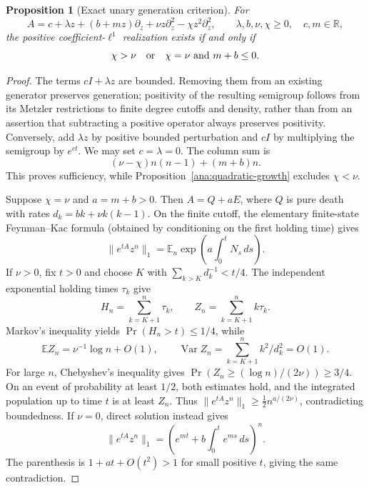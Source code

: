 \documentclass[reqno]{amsart}
\newtheorem{proposition}[theorem]{Proposition}
\theoremstyle{definition}
\theoremstyle{remark}
\newcommand{\R}{\mathbb R}
\begin{document}
\begin{proposition}[Exact unary generation criterion]\label{ana:unary-l1}
For
\[
 A=c+\lambda z+(b+mz)\partial_z+
             \nu z\partial_z^2-\chi z^2\partial_z^2,
 \qquad \lambda,b,\nu,\chi\ge0,\quad c,m\in\R,
\]
the positive coefficient-\(\ell^1\) realization exists if and only if
\[
 \chi>\nu
 \quad\hbox{or}\quad
 \chi=\nu\ \hbox{and}\ m+b\le0 .
\]
\end{proposition}
\begin{proof}
The terms \(cI+\lambda z\) are bounded.  Removing them from an existing
generator preserves generation; positivity of the resulting semigroup
follows from its Metzler restrictions to finite degree cutoffs and
density, rather than from an assertion that subtracting a positive
operator always preserves positivity.  Conversely, add \(\lambda z\)
by positive bounded perturbation and \(cI\) by multiplying the semigroup
by \(e^{ct}\).  We may set \(c=\lambda=0\).
The column sum is
\[
 (\nu-\chi)n(n-1)+(m+b)n.
\]
This proves sufficiency, while Proposition~\ref{ana:quadratic-growth}
excludes \(\chi<\nu\).

Suppose \(\chi=\nu\) and \(a=m+b>0\).  Then \(A=Q+aE\), where \(Q\)
is pure death with rates \(d_k=bk+\nu k(k-1)\).
On the finite cutoff, the elementary finite-state Feynman--Kac formula
(obtained by conditioning on the first holding time) gives
\[
 \|e^{tA}z^n\|_1
 =\mathbb E_n\exp\left(a\int_0^t N_s\,ds\right).
\]
If \(\nu>0\), fix \(t>0\) and choose \(K\) with
\(\sum_{k>K}d_k^{-1}<t/4\).
The independent exponential holding times \(\tau_k\) give
\[
 H_n=\sum_{k=K+1}^n\tau_k,\qquad
 Z_n=\sum_{k=K+1}^n k\tau_k.
\]
Markov's inequality yields \(\Pr(H_n>t)\le1/4\), while
\[
 \mathbb EZ_n=\nu^{-1}\log n+O(1),\qquad
 \operatorname{Var}Z_n=\sum_{k=K+1}^n k^2/d_k^2=O(1).
\]
For large \(n\), Chebyshev's inequality gives
\(\Pr(Z_n\ge(\log n)/(2\nu))\ge3/4\).
On an event of probability at least \(1/2\), both estimates hold, and
the integrated population up to time \(t\) is at least \(Z_n\).
Thus \(\|e^{tA}z^n\|_1\ge\tfrac12 n^{a/(2\nu)}\), contradicting boundedness.
If \(\nu=0\), direct solution instead gives
\[
 \|e^{tA}z^n\|_1
 =\left(e^{mt}+b\int_0^t e^{ms}\,ds\right)^n .
\]
The parenthesis is \(1+at+O(t^2)>1\) for small positive \(t\), giving
the same contradiction.
\end{proof}
\end{document}

